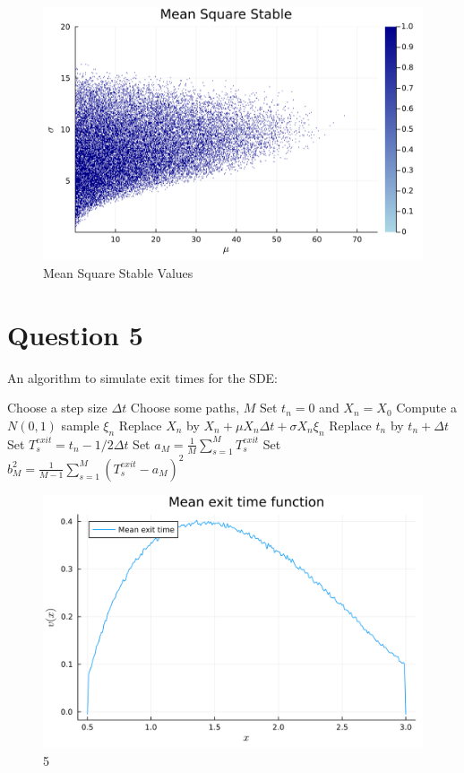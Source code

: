 \documentclass{article}
\begin{document}
\begin{figure}[H]
    \centering
    \includegraphics[scale=0.05]{imgs/4mean_square_stable.png}
    \caption{Mean Square Stable Values}
    \label{fig:meansq}
\end{figure}



\section*{Question 5}

An algorithm to simulate exit times for the SDE:


\begin{algorithmic}[1]
    \State Choose a step size $\Delta t$
    \State Choose some paths, $M$
        \State Set $t_n = 0$ and $X_n = X_0$
            \State Compute a $N(0,1)$ sample $\xi_n$
            \State Replace $X_n$ by $X_n + \mu X_n \Delta t + \sigma X_n \xi_n$
            \State Replace $t_n$ by $t_n + \Delta t$
        \EndWhile
        \State Set $T_s^{exit} = t_n - 1/2 \Delta t$
    \EndFor
    \State Set $a_M = \frac{1}{M} \sum_{s=1}^{M} T_s^{exit}$
    \State Set $b^2_M = \frac{1}{M-1} \sum_{s=1}^{M} (T_s^{exit} - a_M)^2$
\end{algorithmic}

\begin{figure}[H]
            \centering
            \includegraphics[scale=0.05]{imgs/5mean_exit_time.png}
            \caption{5}
            \label{fig:5}
      \end{figure}
\end{document}
